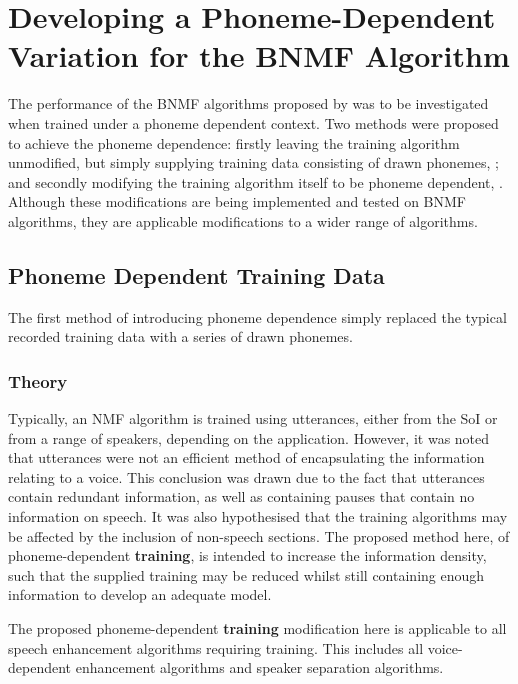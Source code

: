 \section{\label{sec:Develop-Phoneme-Dependent}Developing a Phoneme-Dependent
Variation for the \acl{BNMF} Algorithm}

The performance of the \ac{BNMF} algorithms proposed by \citet{mohammadiha2013supervised}
was to be investigated when trained under a phoneme dependent context.
Two methods were proposed to achieve the phoneme dependence: firstly
leaving the training algorithm unmodified, but simply supplying training
data consisting of drawn phonemes, \textbf{};
and secondly modifying the training algorithm itself to be phoneme
dependent, \textbf{}. Although these
modifications are being implemented and tested on \ac{BNMF} algorithms,
they are applicable modifications to a wider range of algorithms.



\subsection{\label{sub:Phoneme-Training}Phoneme Dependent Training Data}

The first method of introducing phoneme dependence simply replaced
the typical recorded training data with a series of drawn phonemes.


\subsubsection*{Theory}

Typically, an \ac{NMF} algorithm is trained using utterances, either
from the \ac{SoI} or from a range of speakers, depending on the application.
However, it was noted that utterances were not an efficient method
of encapsulating the information relating to a voice. This conclusion
was drawn due to the fact that utterances contain redundant information,
as well as containing pauses that contain no information on speech.
It was also hypothesised that the training algorithms may be affected
by the inclusion of non-speech sections. The proposed method here,
of phoneme-dependent\textbf{ training}, is intended to increase the
information density, such that the supplied training may be reduced
whilst still containing enough information to develop an adequate
model.

The proposed phoneme-dependent\textbf{ training} modification here
is applicable to all speech enhancement algorithms requiring training.
This includes all voice-dependent enhancement algorithms and speaker
separation algorithms.


